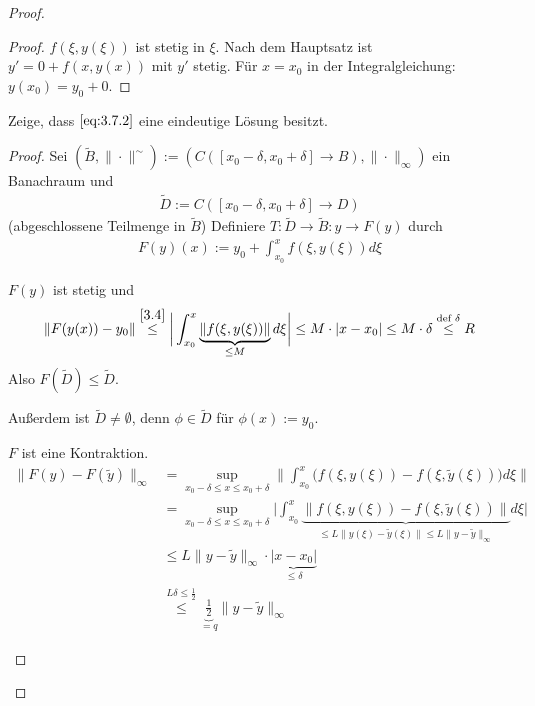 \begin{theorem}
\begin{proof}
\begin{enum-arab}
\begin{proof}
        $f(\xi, y(\xi))$ ist stetig in $\xi$.
        Nach dem Hauptsatz ist $y' = 0 + f(x, y(x))$ mit $y'$ stetig.
        Für $x = x_0$ in der Integralgleichung: $y(x_0) = y_0 + 0$.
      \end{proof}
    \item
      Zeige, dass $\eqref{eq:3.7.2}$ eine eindeutige Lösung besitzt.
      \begin{proof}
        Sei $(\tilde B, \|\cdot\|^{\sim}) := (C([x_0-\delta, x_0+\delta] \to B), \|\cdot\|_\infty)$ ein Banachraum und
        \begin{align*}
          \tilde D := C([x_0 -\delta, x_0 + \delta] \to D) 
        \end{align*}
        (abgeschlossene Teilmenge in $\tilde B$)
        Definiere $T: \tilde D \to \tilde B : y \to F(y)$ durch
        \begin{align*}
          F(y)(x) := y_0 + \int_{x_0}^x f(\xi, y(\xi)) d\xi
        \end{align*}
        \begin{enum-alph}
        \item
          $F(y)$ ist stetig und
          \begin{align*}
            \|F(y(x)) - y_0 \|
            \stackrel{\ref{3.4}}\le \bigg| \int_{x_0}^x \underbrace{\|f(\xi, y(\xi))\|}_{\le M} d\xi \bigg|
            \le M \cdot |x - x_0|
            \le M \cdot \delta
            \stackrel{\text{def } \delta}\le R
          \end{align*}
          Also $F(\tilde D ) \le \tilde D$.
        \item
          Außerdem ist $\tilde D \neq \emptyset$, denn $\phi \in \tilde D$ für $\phi(x) := y_0$.
        \item
          $F$ ist eine Kontraktion.
          \begin{align*}
            \|F(y) - F(\tilde y)\|_\infty
            &= \sup_{x_0-\delta \le x \le x_0+\delta} \bigg\| \int_{x_0}^x \Big( f(\xi, y(\xi)) - f(\xi, \tilde y(\xi)) \Big) d\xi \bigg\| \\
            &= \sup_{x_0-\delta \le x \le x_0+\delta} \bigg| \int_{x_0}^x \underbrace{\Big\| f(\xi, y(\xi)) - f(\xi, \tilde y(\xi)) \Big\|}_{\le L \|y(\xi)-\tilde y(\xi)\| \le L \|y-\tilde y\|_\infty} d\xi \bigg| \\
            &\le L \|y-\tilde y\|_\infty \cdot \underbrace{|x-x_0|}_{\le \delta} \\
            &\stackrel{L \delta \le \frac 12} \le \underbrace{\frac 12}_{=q} \|y-\tilde y\|_\infty

\end{align*}
\end{enum-alph}
\end{proof}
\end{enum-arab}
\end{proof}
\end{theorem}
